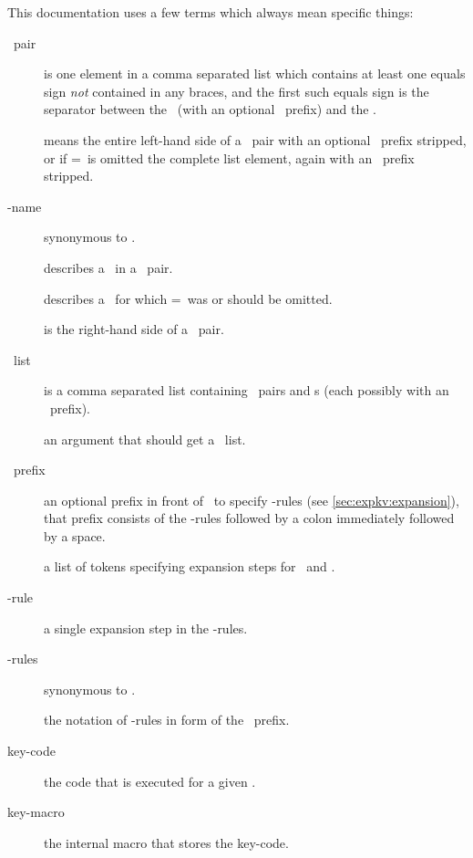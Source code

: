 This documentation uses a few terms which always mean specific things:
\begin{description}
  \item[\kv\ pair]
    is one element in a comma separated list which contains at least one equals
    sign \emph{not} contained in any braces, and the first such equals sign is
    the separator between the \key\ (with an optional \expansion\ prefix) and
    the \val.
  \item[\key]
    means the entire left-hand side of a \kv\ pair with an optional \expansion\
    prefix stripped, or if =\val\ is omitted the complete list element, again
    with an \expansion\ prefix stripped.
  \item[\key-name]
    synonymous to \key.
  \item[\Vkey]
    describes a \key\ in a \kv\ pair.
  \item[\Nkey]
    describes a \key\ for which =\val\ was or should be omitted.
  \item[\val]
    is the right-hand side of a \kv\ pair.
  \item[\kv\ list]
    is a comma separated list containing \kv\ pairs and \Nkey{}s (each possibly
    with an \expansion\ prefix).
  \item[\kvarg]
    an argument that should get a \kv\ list.
  \item[\expansion\ prefix]
    an optional prefix in front of \key\ to specify \expansion-rules (see
    \autoref{sec:expkv:expansion}), that prefix consists of the \expansion-rules
    followed by a colon immediately followed by a space.
  \item[\expansion]
    a list of tokens specifying expansion steps for \key\ and \val.
  \item[\expansion-rule]
    a single expansion step in the \expansion-rules.
  \item[\expansion-rules]
    synonymous to \expansion.
  \item[\expnotation]
    the notation of \expansion-rules in form of the \expansion\ prefix.
  \item[key-code]
    the code that is executed for a given \key.
  \item[key-macro]
    the internal macro that stores the key-code.
\end{description}

